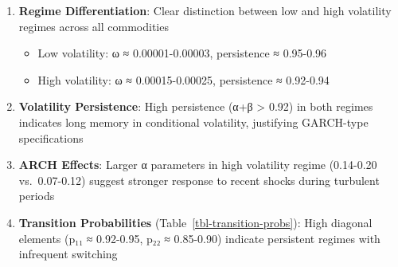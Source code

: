 \documentclass[
  10pt,
  a4paper,
]{article}
\providecommand{\tightlist}{%
  \setlength{\itemsep}{0pt}\setlength{\parskip}{0pt}}
\begin{document}
\begin{enumerate}
\def\labelenumi{\arabic{enumi}.}
\item
  \textbf{Regime Differentiation}: Clear distinction between low and
  high volatility regimes across all commodities

  \begin{itemize}
  \tightlist
  \item
    Low volatility: ω ≈ 0.00001-0.00003, persistence ≈ 0.95-0.96
  \item
    High volatility: ω ≈ 0.00015-0.00025, persistence ≈ 0.92-0.94
  \end{itemize}
\item
  \textbf{Volatility Persistence}: High persistence (α+β \textgreater{}
  0.92) in both regimes indicates long memory in conditional volatility,
  justifying GARCH-type specifications
\item
  \textbf{ARCH Effects}: Larger α parameters in high volatility regime
  (0.14-0.20 vs.~0.07-0.12) suggest stronger response to recent shocks
  during turbulent periods
\item
  \textbf{Transition Probabilities} (Table~\ref{tbl-transition-probs}):
  High diagonal elements (p₁₁ ≈ 0.92-0.95, p₂₂ ≈ 0.85-0.90) indicate
  persistent regimes with infrequent switching
\end{enumerate}
\end{document}
